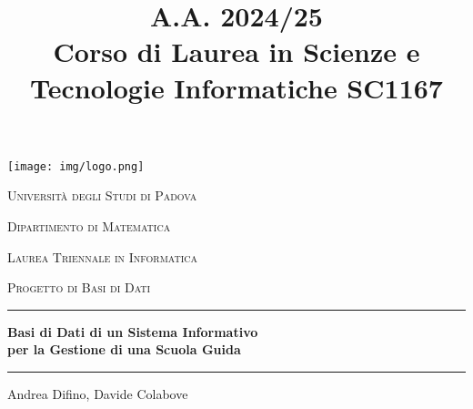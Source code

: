 \documentclass[10pt,twoside]{article}
\begin{document}
\begin{titlepage}
    \centering
    \texttt{[image: img/logo.png]}\par\vspace{1cm}
    {\scshape\Large Università degli Studi di Padova \par}
    \vspace{1.5cm}
    {\scshape\large Dipartimento di Matematica\par}
    \vspace{0.5cm}
    {\scshape\large Laurea Triennale in Informatica\par}
    \vspace{2cm}
    {\scshape\Large Progetto di Basi di Dati\\\par}
    \vspace{1cm}
    \hrule
    \vspace{1cm}
    {\large\bfseries
    Basi di Dati di un Sistema Informativo\\
    per la Gestione di una Scuola Guida\par}
    \vspace{1cm}
    \hrule
    \vfill
    {\large Andrea Difino, Davide Colabove\par}
\end{titlepage}

\clearpage


\pagestyle{fancy}
\fancyhead{}
\title{\fontsize{12}{12}\selectfont \textbf{A.A. 2024/25} \\ Corso di Laurea in Scienze e Tecnologie Informatiche SC1167}
\date{}
\maketitle


\renewcommand{\contentsname}{Indice}
\tableofcontents

\newpage
{}
\end{document}
